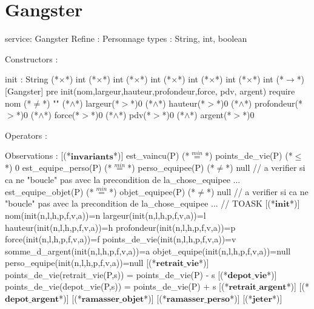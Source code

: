 \documentclass[a4paper, 11pt]{report}
\newcommand{\specB}[1]{\textbf{#1}}
\begin{document}
\section{Gangster}
\begin{Spe}
service: Gangster
Refine : Personnage
types : String, int, boolean
 
Constructors : 

	init : String (*$\times$*) int (*$\times$*) int (*$\times$*) int (*$\times$*) int (*$\times$*) int (*$\times$*) int (*$\rightarrow$*) [Gangster]
		pre init(nom,largeur,hauteur,profondeur,force, pdv, argent) require nom (*$\neq$*) "" (*$\land$*) largeur(*$>$*)0 (*$\land$*) hauteur(*$>$*)0 (*$\land$*) profondeur(*$>$*)0 (*$\land$*) force(*$>$*)0 (*$\land$*) pdv(*$>$*)0 (*$\land$*) argent(*$>$*)0 

Operators :

Observations : 
	[(*$\specB{invariants}$*)]
		est_vaincu(P) (*$\stackrel{min}{=}$*) points_de_vie(P) (*$\le$*) 0
                est_equipe_perso(P) (*$\stackrel{min}{=}$*) perso_equipee(P) (*$\ne$*) null // a verifier si ca ne "boucle" pas avec la precondition de la_chose_equipee ...
		est_equipe_objet(P) (*$\stackrel{min}{=}$*) objet_equipee(P) (*$\ne$*) null // a verifier si ca ne "boucle" pas avec la precondition de la_chose_equipee ... // TOASK
	[(*$\specB{init}$*)]
		nom(init(n,l,h,p,f,v,a))=n
		largeur(init(n,l,h,p,f,v,a))=l
		hauteur(init(n,l,h,p,f,v,a))=h
		profondeur(init(n,l,h,p,f,v,a))=p
		force(init(n,l,h,p,f,v,a))=f
		points_de_vie(init(n,l,h,p,f,v,a))=v
		somme_d_argent(init(n,l,h,p,f,v,a))=a
                objet_equipe(init(n,l,h,p,f,v,a))=null
                perso_equipe(init(n,l,h,p,f,v,a))=null
	[(*$\specB{retrait\_vie}$*)]
		points_de_vie(retrait_vie(P,s)) = points_de_vie(P) - s
	[(*$\specB{depot\_vie}$*)]
		points_de_vie(depot_vie(P,s)) = points_de_vie(P) + s 
	[(*$\specB{retrait\_argent}$*)]
	[(*$\specB{depot\_argent}$*)]
	[(*$\specB{ramasser\_objet}$*)] 
	[(*$\specB{ramasser\_perso}$*)]
	[(*$\specB{jeter}$*)]
 
\end{Spe}
\end{document}
